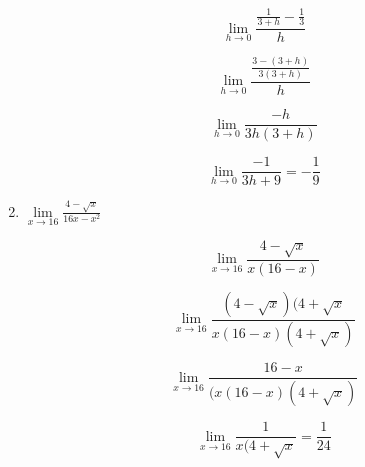 \documentclass{article}
\begin{document}
\begin{enumerate}
			$$\lim \limits _{h \to 0} \frac{\frac{1}{3+h} - \frac{1}{3}}{h}$$

			$$\lim \limits _{h \to 0} \frac{\frac{3 - (3+h)}{3(3+h)}}{h}$$

			$$\lim \limits _{h \to 0} \frac{-h}{3h(3+h)}$$

			$$\lim \limits _{h \to 0} \frac{-1}{3h + 9} = - \frac{1}{9}$$

		\item $\lim \limits _{x \to 16} \frac{4 - \sqrt{x}}{16x - x^2}$

			$$\lim \limits _{x \to 16} \frac{4-\sqrt{x}}{x(16-x)}$$

			$$\lim \limits _{x \to 16} \frac{(4-\sqrt{x})(4+\sqrt{x}}{x(16-x)(4+\sqrt{x})}$$

			$$\lim \limits _{x \to 16} \frac{16-x}{(x(16-x)(4+\sqrt{x})}$$

			$$\lim \limits _{x \to 16} \frac{1}{x(4+\sqrt{x}} = \frac{1}{24}$$
		
	\end{enumerate}
\end{document}
